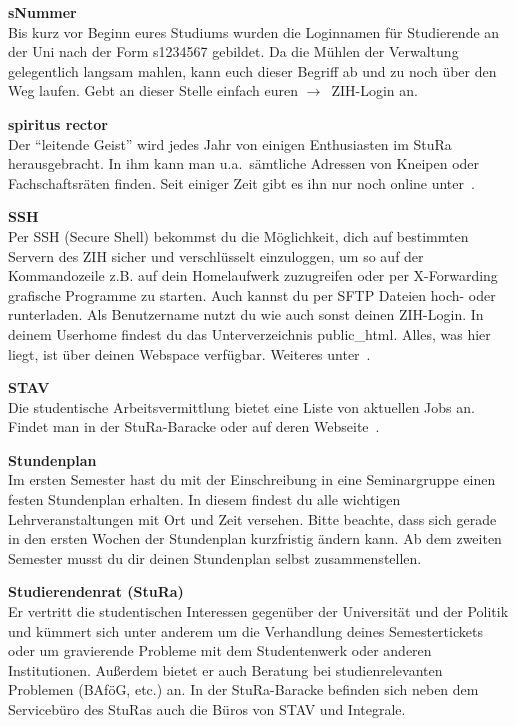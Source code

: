 \begin{multicols}{2}
\textbf{sNummer} \\
Bis kurz vor Beginn eures Studiums wurden die Loginnamen für Studierende an der
Uni nach der Form s1234567 gebildet. Da die Mühlen der Verwaltung gelegentlich
langsam mahlen, kann euch dieser Begriff ab und zu noch über den Weg laufen.
Gebt an dieser Stelle einfach euren $\rightarrow$~ZIH-Login an.

\vfill\columnbreak%

\textbf{spiritus rector} \\
Der \enquote{leitende Geist} wird jedes Jahr von einigen Enthusiasten im StuRa herausgebracht.
In ihm kann man u.a.\ sämtliche Adressen von Kneipen oder Fachschaftsräten finden. Seit einiger Zeit gibt es ihn nur noch online unter~.



\textbf{SSH} \\
Per SSH (Secure Shell) bekommst du die Möglichkeit, dich auf bestimmten Servern des ZIH sicher und verschlüsselt einzuloggen, um so auf der Kommandozeile z.B. auf dein Homelaufwerk zuzugreifen oder per X-Forwarding grafische Programme zu starten.
Auch kannst du per SFTP Dateien hoch- oder runterladen.
Als Benutzername nutzt du wie auch sonst deinen ZIH-Login.
In deinem Userhome findest du das Unterverzeichnis public\_html.
Alles, was hier liegt, ist über deinen Webspace verfügbar.
Weiteres unter~.

\textbf{STAV} \\
Die studentische Arbeitsvermittlung bietet eine Liste von aktuellen Jobs an.
Findet man in der StuRa-Baracke oder auf deren Webseite~.

\textbf{Stundenplan} \\
Im ersten Semester hast du mit der Einschreibung in eine Seminargruppe einen festen Stundenplan erhalten. In diesem findest du alle wichtigen Lehrveranstaltungen mit Ort und Zeit versehen. Bitte beachte, dass sich gerade in den ersten Wochen der Stundenplan kurzfristig ändern kann.
Ab dem zweiten Semester musst du dir deinen Stundenplan selbst zusammenstellen.

\vfill\columnbreak%

\textbf{Studierendenrat (StuRa)} \\
Er vertritt die studentischen Interessen gegenüber der Universität und der Politik und kümmert sich unter anderem um die Verhandlung deines Semestertickets oder um gravierende Probleme mit dem Studentenwerk oder anderen Institutionen.
Außerdem bietet er auch Beratung bei studienrelevanten Problemen (BAföG, etc.) an.
In der StuRa-Baracke befinden sich neben dem Servicebüro des StuRas auch die Büros von STAV und Integrale.~


\end{multicols}
